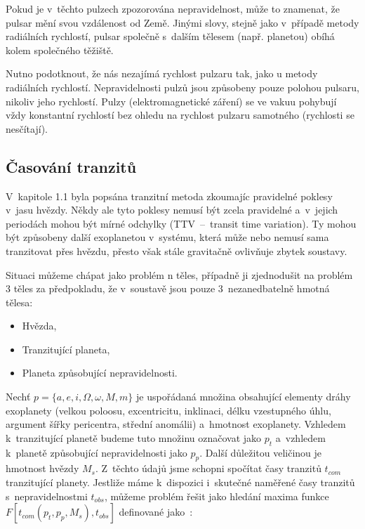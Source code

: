 \documentclass[a4paper,12pt]{article}
\begin{document}
{{{Pokud je v~těchto pulzech zpozorována nepravidelnost, může to znamenat, že pulsar mění svou vzdálenost od Země. Jinými slovy, stejně jako v~případě metody radiálních rychlostí, pulsar společně s~dalším tělesem (např. planetou) obíhá kolem společného těžiště.~\cite{methods}

Nutno podotknout, že nás nezajímá rychlost pulzaru tak, jako u metody radiálních rychlostí. Nepravidelnosti pulzů jsou způsobeny pouze polohou pulsaru, nikoliv jeho rychlostí. Pulzy (elektromagnetické záření) se ve vakuu pohybují vždy konstantní rychlostí bez ohledu na rychlost pulzaru samotného (rychlosti se nesčítají).

\drawgimp

\clearpage
\subsection{Časování tranzitů}


V~kapitole 1.1 byla popsána tranzitní metoda zkoumajíc pravidelné poklesy v~jasu hvězdy. Někdy ale tyto poklesy nemusí být zcela pravidelné a~v~jejich periodách mohou být mírné odchylky (TTV~--~transit time variation). Ty mohou být způsobeny další exoplanetou v~systému, která může nebo nemusí sama tranzitovat přes hvězdu, přesto však stále gravitačně ovlivňuje zbytek soustavy.~\cite{ttv}

Situaci můžeme chápat jako problém n těles, případně ji zjednodušit na problém 3 těles za předpokladu, že v~soustavě jsou pouze 3~nezanedbatelně hmotná tělesa:

\begin{itemize}
\item Hvězda,
\item Tranzitující planeta,
\item Planeta způsobující nepravidelnosti.
\end{itemize}

Nechť $p = \{a, e, i, \Omega, \omega, M, m\}$ je uspořádaná množina obsahující elementy dráhy exoplanety (velkou poloosu, excentricitu, inklinaci, délku vzestupného úhlu, argument šířky pericentra, střední anomálii) a~hmotnost exoplanety. Vzhledem k~tranzitující planetě budeme tuto množinu označovat jako $p_t$ a~vzhledem k~planetě způsobující nepravidelnosti jako $p_p$. Další důležitou veličinou je hmotnost hvězdy $M_s$. Z~těchto údajů jsme schopni spočítat časy tranzitů $t_{com}$ tranzitující planety. Jestliže máme k~dispozici i~skutečné naměřené časy tranzitů s~nepravidelnostmi $t_{obs}$, můžeme problém řešit jako hledání maxima funkce $F[t_{com}(p_t, p_p, M_s), t_{obs}]$ definované jako~\cite{ttv}:

}}}
\end{document}
